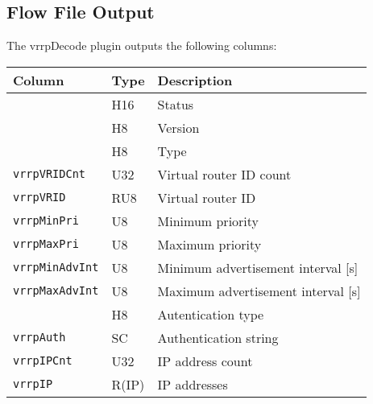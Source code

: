 \documentclass[documentation]{subfiles}
\begin{document}
\subsection{Flow File Output}
The vrrpDecode plugin outputs the following columns:
\begin{longtable}{lll}
    \toprule
    {\bf Column} & {\bf Type} & {\bf Description}\\%
    \midrule\endhead%
    {\tt \nameref{vrrpStat}}     & H16   & Status\\
    {\tt \nameref{vrrpVer}}      & H8    & Version\\
    {\tt \nameref{vrrpType}}     & H8    & Type\\
    {\tt vrrpVRIDCnt}            & U32   & Virtual router ID count\\
    {\tt vrrpVRID}               & RU8   & Virtual router ID\\
    {\tt vrrpMinPri}             & U8    & Minimum priority\\
    {\tt vrrpMaxPri}             & U8    & Maximum priority\\
    {\tt vrrpMinAdvInt}          & U8    & Minimum advertisement interval [s]\\
    {\tt vrrpMaxAdvInt}          & U8    & Maximum advertisement interval [s]\\
    {\tt \nameref{vrrpAuthType}} & H8    & Autentication type\\
    {\tt vrrpAuth}               & SC    & Authentication string\\
    {\tt vrrpIPCnt}              & U32   & IP address count\\
    {\tt vrrpIP}                 & R(IP) & IP addresses\\
    \bottomrule
\end{longtable}
\end{document}
